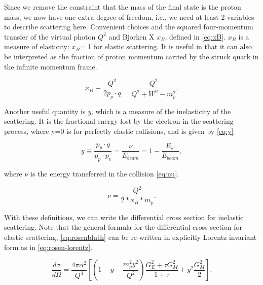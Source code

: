         Since we remove the constraint that the mass of the final state is the proton mass, we now have one extra degree of freedom, i.e., we need at least 2 variables to describe scattering here. Convenient choices and the squared four-momentum transfer of the virtual photon $Q^2$ and Bjorken X $x_B$, defined in \eqref{eq:xB}. $x_B$ is a measure of elasticity: $x_B$= 1 for elastic scattering. It is useful in that it can also be interpreted as the fraction of proton momentum carried by the struck quark in the infinite momentum frame.       %

        \begin{equation}\label{eq:xB}
            x_B \equiv \frac{Q^2}{2p_p\cdot q} = \frac{Q^2}{Q^2+W^2-m_p^2}.
        \end{equation}


        Another useful quantity is \textit{y}, which is a measure of the inelasticity of the scattering. It is the fractional energy lost by the electron in the scattering process, where y=0 is for perfectly elastic collisions, and is given by \eqref{eq:y}
        
        \begin{equation}\label{eq:y}
            y \equiv \frac{p_p \cdot q}{p_p \cdot p_e} = \frac{\nu}{E_{beam}} =  1 - \frac{E_{e'}}{E_{beam}},
        \end{equation}

        where $\nu$ is the energy transferred in the collision \eqref{eq:nu}. 
        
        \begin{equation}\label{eq:nu}
            \nu = \frac{Q^2}{2*x_B*m_p}.
        \end{equation}
        

        With these definitions, we can write the differential cross section for inelastic scattering. Note that the general formula for the differential cross section for elastic scattering, \eqref{eq:rosenbluth} can be re-written in explicitly Lorentz-invariant form as in \eqref{eq:rosen-lorentz}.

        \begin{equation}\label{eq:rosen-lorentz}
            \frac{d\sigma}{d\Omega} = \frac{4\pi\alpha^2}{Q^4} \left[ \left( 1 -y -\frac{m_p^2 y^2}{Q^2}       \right) \frac{G_E^2+\tau G_M^2}{1+\tau} +y^2 \frac{G_M^2}{2} \right].
        \end{equation}

